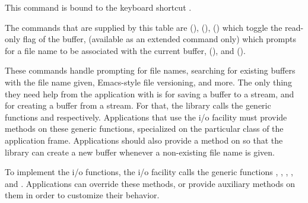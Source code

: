 This command is bound to the keyboard shortcut .


The commands that are supplied by this table
are  (),
 (),
 () which toggle the read-only
flag of the buffer,  (available as
an extended command only) which prompts for a file name to be
associated with the current buffer, 
(), and  ().

These commands handle prompting for file names, searching for existing
buffers with the file name given, Emacs-style file versioning, and
more.  The only thing they need help from the application with is for
saving a buffer to a stream, and for creating a buffer from a stream.
For that, the \sysname{} library calls the generic functions
 and
 respectively.
Applications that use the \sysname{} i/o facility must provide methods
on these generic functions, specialized on the particular class of the
application frame.  Applications should also provide a method on
 so that the \sysname{}
library can create a new buffer whenever a non-existing file name is
given.

To implement the i/o functions, the \sysname{} i/o facility calls the
generic functions ,
,
,
, and
.  Applications can override these
methods, or provide auxiliary methods on them in order to customize
their behavior.
